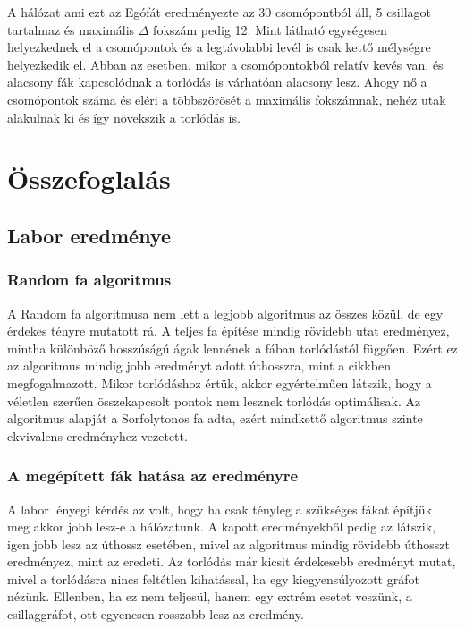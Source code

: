 \documentclass[12pt]{report}
\begin{document}
A hálózat ami ezt az Egófát eredményezte az 30 csomópontból áll, 5 csillagot tartalmaz és maximális $\Delta$ fokszám pedig 12. 
Mint látható egységesen helyezkednek el a csomópontok és a legtávolabbi levél is csak kettő mélységre helyezkedik el.
Abban az esetben, mikor a csomópontokból relatív kevés van, és alacsony fák kapcsolódnak a torlódás is várhatóan alacsony lesz. 
Ahogy nő a csomópontok száma és eléri a többszörösét a maximális fokszámnak, nehéz utak alakulnak ki és így növekszik a torlódás is.

\chapter{Összefoglalás}

\section{Labor eredménye}

\subsection{Random fa algoritmus}

A Random fa algoritmusa nem lett a legjobb algoritmus az összes közül, de egy érdekes tényre mutatott rá.
A teljes fa építése mindig rövidebb utat eredményez, mintha különböző hosszúságú ágak lennének a fában torlódástól függően.
Ezért ez az algoritmus mindig jobb eredményt adott úthosszra, mint a cikkben megfogalmazott.
Mikor torlódáshoz értük, akkor egyértelműen látszik, hogy a véletlen szerűen összekapcsolt pontok nem lesznek torlódás optimálisak.
Az algoritmus alapját a Sorfolytonos fa adta, ezért mindkettő algoritmus szinte ekvivalens eredményhez vezetett.
 
\subsection{A megépített fák hatása az eredményre}

A labor lényegi kérdés az volt, hogy ha csak tényleg a szükséges fákat építjük meg akkor jobb lesz-e a hálózatunk.
A kapott eredményekből pedig az látszik, igen jobb lesz az úthossz esetében, mivel az algoritmus mindig rövidebb úthosszt eredményez, mint az eredeti.
Az torlódás már kicsit érdekesebb eredményt mutat, mivel a torlódásra nincs feltétlen kihatással, ha egy kiegyensúlyozott gráfot nézünk.
Ellenben, ha ez nem teljesül, hanem egy extrém esetet veszünk, a csillaggráfot, ott egyenesen rosszabb lesz az eredmény.
\end{document}
